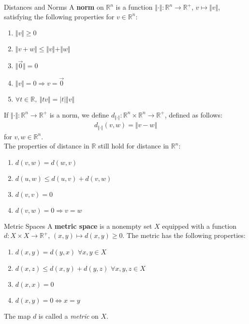 \documentclass[10pt]{extarticle}
\newcommand{\R}{\mathbb{R}}
\begin{document}
  \begin{problem}{Distances and Norms}
    A \textbf{norm} on $\R^n$ is a function $\Vert \cdot \Vert: \R^n \rightarrow \R^+$, $v\mapsto \Vert v \Vert$, satisfying the following properties for $v\in\R^n$:
    \begin{enumerate}[(1)]
      \item $\Vert v \Vert \geq 0$
      \item $\Vert v + w \Vert \leq \Vert v \Vert + \Vert w \Vert$
      \item $\Vert \vec{0}\Vert = 0$
      \item $\Vert v \Vert = 0\Rightarrow v = \vec{0}$
      \item $\forall t\in\R,~\Vert tv \Vert = |t|\Vert v\Vert$
    \end{enumerate}
    If $\Vert \cdot \Vert: \R^n \rightarrow \R^+$ is a norm, we define $d_{\Vert \cdot \Vert}: \R^n \times \R^n \rightarrow \R^+$, defined as follows:
    \begin{align*}
      d_{\Vert \cdot \Vert}(v,w) = \Vert v-w \Vert
    \end{align*}
    for $v,w\in\R^n$.\\

    The properties of distance in $\R$ still hold for distance in $\R^n$:
    \begin{enumerate}[(1)]
      \item $d(v,w) = d(w,v)$
      \item $d(u,w) \leq d(u,v) + d(v,w)$
      \item $d(v,v) = 0$
      \item $d(v,w) = 0 \Rightarrow v=w$
    \end{enumerate}
  \end{problem}
  \begin{problem}{Metric Spaces}
    A \textbf{metric space} is a nonempty set $X$ equipped with a function $d: X\times X \rightarrow \R^+$, $(x,y)\mapsto d(x,y) \geq 0$. The metric has the following properties:
    \begin{enumerate}[(1)]
      \item $d(x,y) = d(y,x)$ $\forall x,y\in X$
      \item $d(x,z) \leq d(x,y) + d(y,z)$ $\forall x,y,z\in X$
      \item $d(x,x) = 0$
      \item $d(x,y) = 0 \Leftrightarrow x=y$
    \end{enumerate}
    The map $d$ is called a \textit{metric} on $X$.
  \end{problem}
\end{document}
